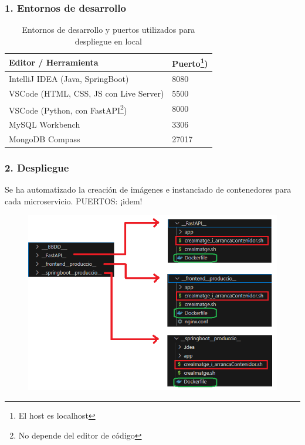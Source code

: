 \documentclass{beamer}
\begin{document}
	\begin{frame}
		\frametitle{1. Entornos de desarrollo}
					
		\begin{table}[h!]
			\centering
			\begin{tabular}{|l|l|}
				\hline
				\textbf{Editor / Herramienta} & \textbf{Puerto\footnote{El host es localhost})} \\
				\hline
				IntelliJ IDEA (Java, SpringBoot) & 8080 \\
				VSCode (HTML, CSS, JS con Live Server) & 5500 \\
				VSCode (Python, con FastAPI\footnote{No depende del editor de código}) & 8000 \\
				MySQL Workbench & 3306 \\
				MongoDB Compass & 27017 \\
				\hline
			\end{tabular}
			\caption{Entornos de desarrollo y puertos utilizados para despliegue en local}
		\end{table}
	\end{frame}
	
	
	
	

	
	\begin{frame}
		\frametitle{2. Despliegue}
		Se ha automatizado la creación de imágenes e instanciado de contenedores para cada microservicio. PUERTOS: ¡idem!
		
		\begin{figure}
			\centering
			\includegraphics[width=.7\linewidth]{../img/dockeritzacioAplicacioPlantilla}
			\label{fig:dockeritzacioaplicacioplantilla}
		\end{figure}
	\end{frame}
	
\end{document}
